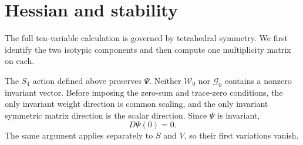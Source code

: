 \documentclass[11pt]{article}
\theoremstyle{remark}
\begin{document}
\section{Hessian and stability}

The full ten-variable calculation is governed by tetrahedral symmetry.  We first identify
the two isotypic components and then compute one multiplicity matrix on each.

The $S_4$ action defined above preserves $\Psi$.  Neither $\mathcal W_0$ nor $\mathcal G_0$ contains a nonzero invariant vector.
Before imposing the zero-sum and trace-zero conditions, the only invariant weight direction is common scaling, and the only invariant symmetric matrix direction is the scalar direction.  Since $\Psi$ is invariant,
\begin{equation}\label{eq:critical}
 D\Psi(0)=0.
\end{equation}
The same argument applies separately to $S$ and $V$, so their first variations vanish.
\end{document}
